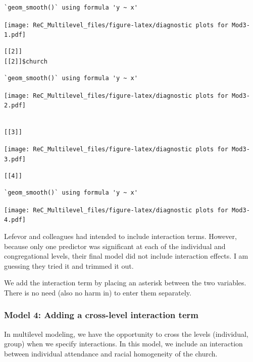 \documentclass[
  english,
]{book}
\begin{document}
\begin{verbatim}
`geom_smooth()` using formula 'y ~ x'
\end{verbatim}

\texttt{[image: ReC\_Multilevel\_files/figure-latex/diagnostic plots for Mod3-1.pdf]}

\begin{verbatim}
[[2]]
[[2]]$church
\end{verbatim}

\begin{verbatim}
`geom_smooth()` using formula 'y ~ x'
\end{verbatim}

\texttt{[image: ReC\_Multilevel\_files/figure-latex/diagnostic plots for Mod3-2.pdf]}

\begin{verbatim}

[[3]]
\end{verbatim}

\texttt{[image: ReC\_Multilevel\_files/figure-latex/diagnostic plots for Mod3-3.pdf]}

\begin{verbatim}
[[4]]
\end{verbatim}

\begin{verbatim}
`geom_smooth()` using formula 'y ~ x'
\end{verbatim}

\texttt{[image: ReC\_Multilevel\_files/figure-latex/diagnostic plots for Mod3-4.pdf]}

Lefevor and colleagues \citep{lefevor_homonegativity_2020} had intended to include interaction terms. However, because only one predictor was significant at each of the individual and congregational levels, their final model did not include interaction effects. I am guessing they tried it and trimmed it out.

We add the interaction term by placing an asterisk between the two variables. There is no need (also no harm in) to enter them separately.

\hypertarget{model-4-adding-a-cross-level-interaction-term}{%
\subsubsection{Model 4: Adding a cross-level interaction term}\label{model-4-adding-a-cross-level-interaction-term}}

In multilevel modeling, we have the opportunity to cross the levels (individual, group) when we specify interactions. In this model, we include an interaction between individual attendance and racial homogeneity of the church.
\end{document}

